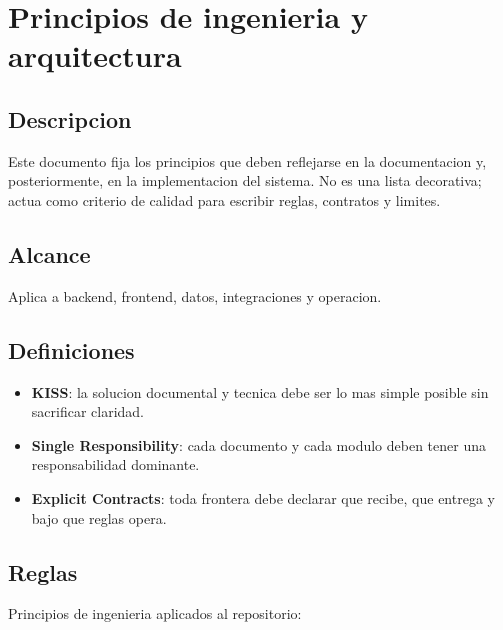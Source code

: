 \section{Principios de ingenieria y arquitectura}

\subsection{Descripcion}

Este documento fija los principios que deben reflejarse en la documentacion y, posteriormente, en la implementacion del sistema. No es una lista decorativa; actua como criterio de calidad para escribir reglas, contratos y limites.

\subsection{Alcance}

Aplica a backend, frontend, datos, integraciones y operacion.

\subsection{Definiciones}

\begin{itemize}
  \item \textbf{KISS}: la solucion documental y tecnica debe ser lo mas simple posible sin sacrificar claridad.
  \item \textbf{Single Responsibility}: cada documento y cada modulo deben tener una responsabilidad dominante.
  \item \textbf{Explicit Contracts}: toda frontera debe declarar que recibe, que entrega y bajo que reglas opera.
\end{itemize}

\subsection{Reglas}

Principios de ingenieria aplicados al repositorio:

